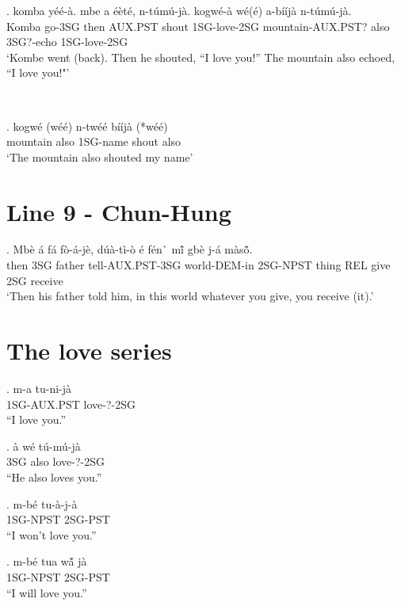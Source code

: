 \documentclass{assets/fieldnotes}
\begin{document}
\exg. komba yéé-à. mbe a éèté, n-túmú-jà. kogwé-à wé(é) a-bííjà n-túmú-jà.\\
Komba go-3SG then AUX.PST shout 1SG-love-2SG mountain-AUX.PST? also 3SG?-echo 1SG-love-2SG\\
`Kombe went (back). Then he shouted, ``I love you!'' The mountain also echoed, ``I love you!"'

\\

\exg. kogwé (wéé) n-twéé bííjà (*wéé)\\
mountain also 1SG-name shout also\\
`The mountain also shouted my name'


\section{Line 9 - Chun-Hung} 

\exg. Mb\`{e} \'{a} f\'{a} f\`{o}-\'{a}-j\`{e}, d\'{u}\textipa{\textltailn}\`{a}-t\`{i}-\`{o} \'{e} f\'{e}n\`{} mĩ́ gb\`{e} j-\'{a} m\`{a}sõ̂. \\
then 3SG father tell-AUX.PST-3SG world-DEM-in 2SG-NPST thing REL give 2SG receive \\
`Then his father told him, in this world whatever you give, you receive (it).' 


\section{The love series}
\exg. m-a tu-ni-jà\\
1SG-AUX.PST  love-?-2SG\\
``I love you.''

\exg. à wé tú-mú-jà\\ 
3\textsc{SG} also love-?-2SG\\
``He also loves you.''

\exg. m-bé tu-à-j-à\\
 1SG-NPST       2SG-PST\\
``I won't love you.''

\exg. m-bé tua wá̃ jà\\
1SG-NPST        2SG-PST\\
``I will love you.''
\end{document}
